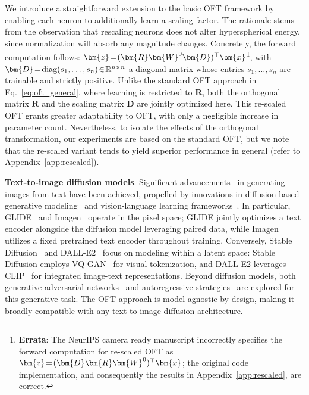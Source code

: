 We introduce a straightforward extension to the basic OFT framework by enabling each neuron to additionally learn a scaling factor. The rationale stems from the observation that rescaling neurons does not alter hyperspherical energy, since normalization will absorb any magnitude changes. Concretely, the forward computation follows: $\thickmuskip=2mu \medmuskip=2mu\bm{z}=(\bm{R}\bm{W}^0\bm{D})^\top\bm{x}$\footnote{\textbf{Errata}: The NeurIPS camera ready manuscript incorrectly specifies the forward computation for re-scaled OFT as $\thickmuskip=2mu \medmuskip=2mu\bm{z}=(\bm{D}\bm{R}\bm{W}^0)^\top\bm{x}$; the original code implementation, and consequently the results in Appendix~\ref{app:rescaled}, are correct.}, with $\thickmuskip=2mu \medmuskip=2mu \bm{D} = \text{diag}(s_1,\ldots,s_n) \in \mathbb{R}^{n\times n}$ a diagonal matrix whose entries $s_1,\ldots,s_n$ are trainable and strictly positive. Unlike the standard OFT approach in Eq.~\eqref{eq:oft_general}, where learning is restricted to $\bm{R}$, both the orthogonal matrix $\bm{R}$ and the scaling matrix $\bm{D}$ are jointly optimized here. This re-scaled OFT grants greater adaptability to OFT, with only a negligible increase in parameter count. Nevertheless, to isolate the effects of the orthogonal transformation, our experiments are based on the standard OFT, but we note that the re-scaled variant tends to yield superior performance in general (refer to Appendix~\ref{app:rescaled}).

\textbf{Text-to-image diffusion models}. Significant advancements~\cite{saharia2022photorealistic,ramesh2022hierarchical,rombach2022high,gu2022vector,nichol2022glide} in generating images from text have been achieved, propelled by innovations in diffusion-based generative modeling~\cite{ho2020denoising,song2021score,song2021denoising,dhariwal2021diffusion} and vision-language learning frameworks~\cite{su2020vlbert,lu2019vilbert,radford2021learning,wang2021simvlm,li2022blip,li2023blip,alayrac2022flamingo,schuhmann2022laion}. In particular, GLIDE~\cite{nichol2022glide} and Imagen~\cite{saharia2022photorealistic} operate in the pixel space; GLIDE jointly optimizes a text encoder alongside the diffusion model leveraging paired data, while Imagen utilizes a fixed pretrained text encoder throughout training. Conversely, Stable Diffusion~\cite{rombach2022high} and DALL-E2~\cite{ramesh2022hierarchical} focus on modeling within a latent space: Stable Diffusion employs VQ-GAN~\cite{esser2021taming} for visual tokenization, and DALL-E2 leverages CLIP~\cite{radford2021learning} for integrated image-text representations. Beyond diffusion models, both generative adversarial networks~\cite{reed2016generative,zhang2017stackgan,xu2018attngan,li2019controllable} and autoregressive strategies~\cite{ramesh2021zero,ding2021cogview,wu2022nuwa,yuscaling} are explored for this generative task. The OFT approach is model-agnostic by design, making it broadly compatible with any text-to-image diffusion architecture.

